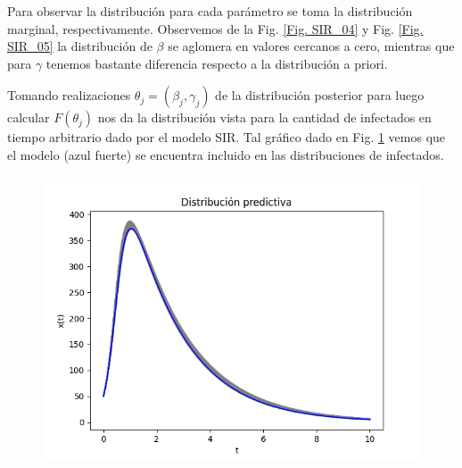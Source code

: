 Para observar la distribución para cada parámetro se toma la distribución marginal, respectivamente. Observemos de la Fig. \ref{Fig. SIR_04} y Fig. \ref{Fig. SIR_05} la distribución de $\beta$ se aglomera en valores cercanos a cero, mientras que para $\gamma$ tenemos bastante diferencia respecto a la distribución a priori.



Tomando realizaciones $ \theta_j = (\beta_j,\gamma_j)$ de la distribución posterior para luego calcular $F(\theta_j)$ nos da la distribución vista para la cantidad de infectados en tiempo arbitrario dado por el modelo SIR. Tal gráfico dado en Fig. \ref{Fig. SIR_06} vemos que el modelo (azul fuerte) se encuentra incluido en las distribuciones de infectados.

\begin{figure}[H] 
    \centering 
    \includegraphics[width = 10 cm ]{img/Exp_Central_SIR_sigma/Figuras/Generales/Predictiva_SIR_sigma.png} 
    \label{Fig. SIR_06}
\end{figure} 





